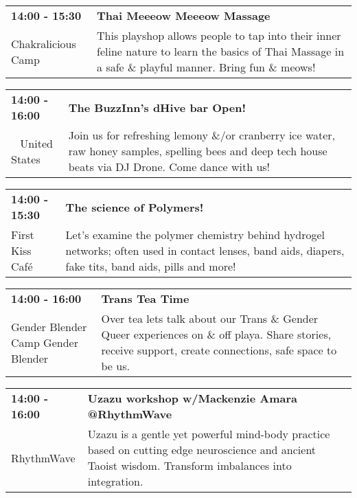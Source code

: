 \begin{tabular}{ p{1in} p{2.2in} }
    \textbf{14:00 - 15:30} & \textbf{Thai Meeeow Meeeow Massage} \\
    Chakralicious Camp \newline  & This playshop allows people to tap into their inner feline nature to learn the basics of Thai Massage in a safe \& playful manner. Bring fun \& meows! \\
    \hline 
\end{tabular}
    
\begin{tabular}{ p{1in} p{2.2in} }
    \textbf{14:00 - 16:00} & \textbf{The BuzzInn's dHive bar Open!} \\
    ~ \newline United States & Join us for refreshing lemony \&/or cranberry ice water, raw honey samples, spelling bees and deep tech house beats via DJ Drone.  Come dance with us! \\
    \hline 
\end{tabular}
    
\begin{tabular}{ p{1in} p{2.2in} }
    \textbf{14:00 - 15:30} & \textbf{The science of Polymers!} \\
    First Kiss Caf\'e \newline  & Let's examine the polymer chemistry behind hydrogel networks; often used in contact lenses, band aids, diapers, fake tits, band aids, pills and more! \\
    \hline 
\end{tabular}
    
\begin{tabular}{ p{1in} p{2.2in} }
    \textbf{14:00 - 16:00} & \textbf{Trans Tea Time } \\
    Gender Blender \newline Camp Gender Blender & Over tea lets talk about our Trans \& Gender Queer experiences on \& off playa. Share stories, receive support, create connections, safe space to be us. \\
    \hline 
\end{tabular}
    
\begin{tabular}{ p{1in} p{2.2in} }
    \textbf{14:00 - 16:00} & \textbf{Uzazu workshop w/Mackenzie Amara  @RhythmWave} \\
    RhythmWave \newline  & Uzazu is a gentle yet powerful mind-body practice based on cutting edge neuroscience and ancient Taoist wisdom. Transform imbalances into integration. \\
    \hline 
\end{tabular}
    
